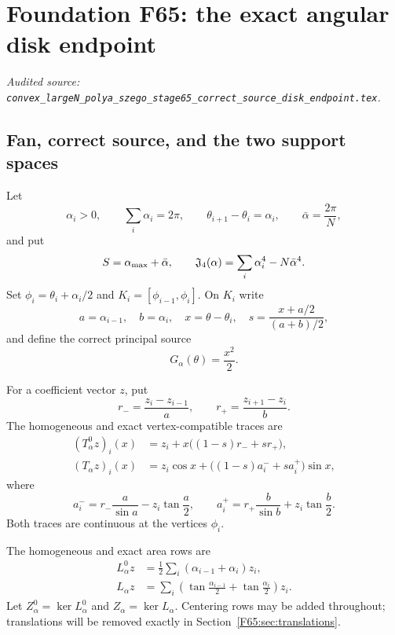 \begingroup
\section{Foundation F65: the exact angular disk endpoint}
\label{module:F65}
\noindent\textit{Audited source: \nolinkurl{convex_largeN_polya_szego_stage65_correct_source_disk_endpoint.tex}.}
\subsection{Fan, correct source, and the two support spaces}

Let
\begin{equation}\label{F65:eq:fan}
 \alpha_i>0,\qquad \sum_i\alpha_i=2\pi,
 \qquad \theta_{i+1}-\theta_i=\alpha_i,
 \qquad \bar\alpha=\frac{2\pi}{N},
\end{equation}
and put
\begin{equation}\label{F65:eq:SJ}
 S=\alpha_{\max}+\bar\alpha,
 \qquad
 \mathfrak J_4(\alpha)=\sum_i\alpha_i^4-N\bar\alpha^4.
\end{equation}
Set $\phi_i=\theta_i+\alpha_i/2$ and
$K_i=[\phi_{i-1},\phi_i]$.  On $K_i$ write
\begin{equation}
 a=\alpha_{i-1},\quad b=\alpha_i,\quad
 x=\theta-\theta_i,\quad
 s=\frac{x+a/2}{(a+b)/2},
\end{equation}
and define the correct principal source
\begin{equation}\label{F65:eq:G}
 G_\alpha(\theta)=\frac{x^2}{2}.
\end{equation}

For a coefficient vector $z$, put
\begin{equation}
 r_- =\frac{z_i-z_{i-1}}a,
 \qquad r_+=\frac{z_{i+1}-z_i}b.
\end{equation}
The homogeneous and exact vertex-compatible traces are
\begin{align}
 (T_\alpha^0z)_i(x)
 &=z_i+x\bigl((1-s)r_-+sr_+\bigr),\label{F65:eq:T0}\\
 (T_\alpha z)_i(x)
 &=z_i\cos x+\bigl((1-s)a_i^-+sa_i^+\bigr)\sin x,
 \label{F65:eq:T}
\end{align}
where
\begin{equation}\label{F65:eq:apm}
 a_i^-=r_-\frac a{\sin a}-z_i\tan\frac a2,
 \qquad
 a_i^+=r_+\frac b{\sin b}+z_i\tan\frac b2.
\end{equation}
Both traces are continuous at the vertices $\phi_i$.

The homogeneous and exact area rows are
\begin{align}
 L_\alpha^0z
 &=\frac12\sum_i(\alpha_{i-1}+\alpha_i)z_i,\label{F65:eq:L0}\\
 L_\alpha z
 &=\sum_i\left(\tan\frac{\alpha_{i-1}}2
 +\tan\frac{\alpha_i}2\right)z_i.\label{F65:eq:L}
\end{align}
Let $Z_\alpha^0=\ker L_\alpha^0$ and $Z_\alpha=\ker L_\alpha$.
Centering rows may be added throughout; translations will be removed exactly
in Section~\ref{F65:sec:translations}.

